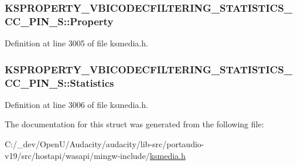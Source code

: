 \subsubsection[{\texorpdfstring{Property}{Property}}]{ K\+S\+P\+R\+O\+P\+E\+R\+T\+Y\+\_\+\+V\+B\+I\+C\+O\+D\+E\+C\+F\+I\+L\+T\+E\+R\+I\+N\+G\+\_\+\+S\+T\+A\+T\+I\+S\+T\+I\+C\+S\+\_\+\+C\+C\+\_\+\+P\+I\+N\+\_\+\+S\+::\+Property}\hypertarget{struct_k_s_p_r_o_p_e_r_t_y___v_b_i_c_o_d_e_c_f_i_l_t_e_r_i_n_g___s_t_a_t_i_s_t_i_c_s___c_c___p_i_n___s_a2e8cd4eedb0aa18cb87658f23dddceee}{}\label{struct_k_s_p_r_o_p_e_r_t_y___v_b_i_c_o_d_e_c_f_i_l_t_e_r_i_n_g___s_t_a_t_i_s_t_i_c_s___c_c___p_i_n___s_a2e8cd4eedb0aa18cb87658f23dddceee}


Definition at line 3005 of file ksmedia.\+h.

\subsubsection[{\texorpdfstring{Statistics}{Statistics}}]{ K\+S\+P\+R\+O\+P\+E\+R\+T\+Y\+\_\+\+V\+B\+I\+C\+O\+D\+E\+C\+F\+I\+L\+T\+E\+R\+I\+N\+G\+\_\+\+S\+T\+A\+T\+I\+S\+T\+I\+C\+S\+\_\+\+C\+C\+\_\+\+P\+I\+N\+\_\+\+S\+::\+Statistics}\hypertarget{struct_k_s_p_r_o_p_e_r_t_y___v_b_i_c_o_d_e_c_f_i_l_t_e_r_i_n_g___s_t_a_t_i_s_t_i_c_s___c_c___p_i_n___s_a6337d01237ef541832df0bf21bab6f27}{}\label{struct_k_s_p_r_o_p_e_r_t_y___v_b_i_c_o_d_e_c_f_i_l_t_e_r_i_n_g___s_t_a_t_i_s_t_i_c_s___c_c___p_i_n___s_a6337d01237ef541832df0bf21bab6f27}


Definition at line 3006 of file ksmedia.\+h.



The documentation for this struct was generated from the following file\+:\begin{DoxyCompactItemize}
\item 
C\+:/\+\_\+dev/\+Open\+U/\+Audacity/audacity/lib-\/src/portaudio-\/v19/src/hostapi/wasapi/mingw-\/include/\hyperlink{ksmedia_8h}{ksmedia.\+h}\end{DoxyCompactItemize}
